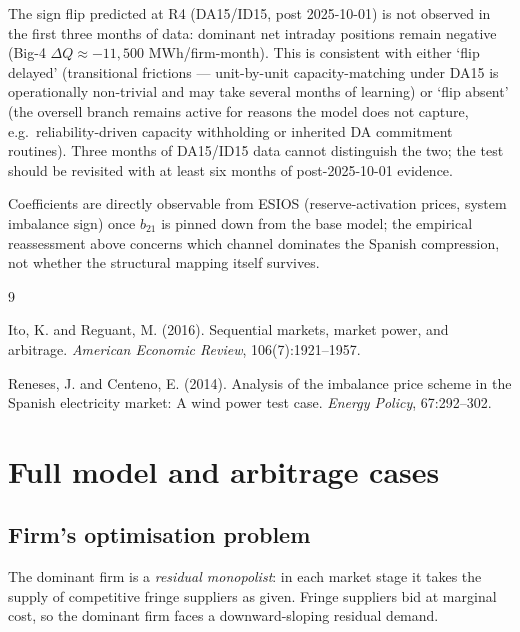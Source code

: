 \documentclass[11pt,a4paper]{article}
\begin{document}
The sign flip predicted at R4 (DA15/ID15, post 2025-10-01) is not
observed in the first three months of data: dominant net intraday
positions remain negative (Big-4 $\Delta Q \approx -11{,}500$
MWh/firm-month). This is consistent with either `flip delayed'
(transitional frictions --- unit-by-unit capacity-matching under DA15
is operationally non-trivial and may take several months of learning)
or `flip absent' (the oversell branch remains active for reasons the
model does not capture, e.g.\ reliability-driven capacity withholding
or inherited DA commitment routines). Three months of DA15/ID15 data
cannot distinguish the two; the test should be revisited with at least
six months of post-2025-10-01 evidence.

Coefficients are directly observable from ESIOS (reserve-activation
prices, system imbalance sign) once $b_{21}$ is pinned down from the
base model; the empirical reassessment above concerns which channel
dominates the Spanish compression, not whether the structural mapping
itself survives.

\begin{thebibliography}{9}

Ito, K. and Reguant, M. (2016).
Sequential markets, market power, and arbitrage.
\emph{American Economic Review}, 106(7):1921--1957.

Reneses, J. and Centeno, E. (2014).
Analysis of the imbalance price scheme in the Spanish electricity market:
A wind power test case.
\emph{Energy Policy}, 67:292--302.

\end{thebibliography}

\appendix

\section{Full model and arbitrage cases}
\label{app:model}

\subsection{Firm's optimisation problem}

The dominant firm is a \emph{residual monopolist}: in each market stage it takes the supply of
competitive fringe suppliers as given. Fringe suppliers bid at marginal cost, so the dominant firm
faces a downward-sloping residual demand.
\end{document}
